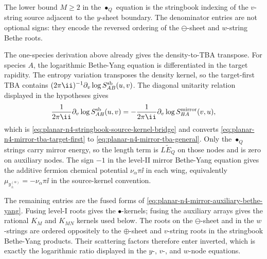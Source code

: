 The lower bound \(M\geq2\) in the \(\bullet_Q\) equation is the stringbook
indexing of the \(v\)-string source adjacent to the \(y\)-sheet boundary.
The denominator entries are not optional signs: they encode the reversed
ordering of the \(\ominus\)-sheet and \(w\)-string Bethe roots.

The one-species derivation above already gives the density-to-TBA transpose.
For species \(A\), the logarithmic Bethe-Yang equation is differentiated in
the target rapidity.  The entropy variation transposes the density kernel, so
the target-first TBA contains
\((2\pi\ii)^{-1}\partial_v\log S^{\rm sb}_{AB}(u,v)\).  The diagonal
unitarity relation displayed in the hypotheses gives
\[
  \frac{1}{2\pi\ii}\partial_v\log S^{\rm sb}_{AB}(u,v)
  =
  -
  \frac{1}{2\pi\ii}\partial_v\log S^{\rm mirror}_{BA}(v,u),
\]
which is \eqref{eq:planar-n4-stringbook-source-kernel-bridge} and converts
\eqref{eq:planar-n4-mirror-tba-target-first} to
\eqref{eq:planar-n4-mirror-tba-general}.  Only the \(\bullet_Q\) strings carry
mirror energy, so the length term is \(L\widetilde E_Q\) on those nodes and is
zero on auxiliary nodes.  The sign \(-1\) in the level-II mirror Bethe-Yang
equation gives the additive fermion chemical potential
\(\nu_\alpha\pi\ii\) in each wing, equivalently
\(\mu_{y_\pm^{(\alpha)}}=-\nu_\alpha\pi\ii\) in the source-kernel convention.

The remaining entries are the fused forms of
\eqref{eq:planar-n4-mirror-auxiliary-bethe-yang}.  Fusing level-I roots gives
the \(\bullet\)-kernels; fusing the auxiliary arrays gives the rational
\(K_M\) and \(K_{MN}\) kernels used below.  The roots on the
\(\ominus\)-sheet and in the \(w\)-strings are ordered oppositely to the
\(\oplus\)-sheet and \(v\)-string roots in the stringbook Bethe-Yang
products.  Their scattering factors therefore enter inverted, which is
exactly the logarithmic ratio displayed in the \(y\)-, \(v\)-, and
\(w\)-node equations.

